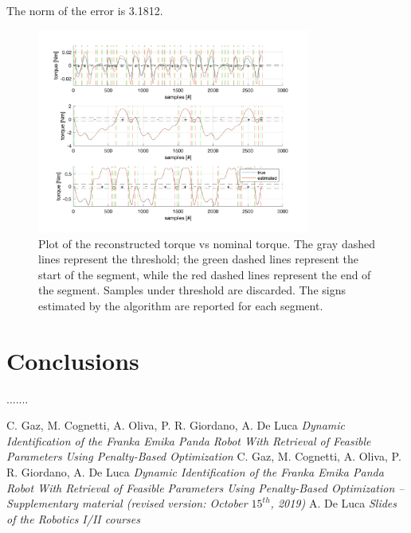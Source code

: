 \documentclass{article}
\begin{document}
The norm of the error is 3.1812.

\begin{figure}[!htbp]
\centering
\includegraphics[width=0.8\textwidth]{images/3-dof/results_experiment4.png}
\caption{Plot of the reconstructed torque vs nominal torque. The gray dashed lines represent the threshold; the green dashed lines represent the start of the segment, while the red dashed lines represent the end of the segment. Samples under threshold are discarded. The signs estimated by the algorithm are reported for each segment.}
\end{figure}
\FloatBarrier

\section{Conclusions}
.......
\clearpage

\begin{thebibliography}{}
C. Gaz, M. Cognetti, A. Oliva, P. R. Giordano, A. De Luca
\emph {Dynamic Identification of the Franka Emika Panda Robot With Retrieval of Feasible Parameters Using Penalty-Based Optimization}
C. Gaz, M. Cognetti, A. Oliva, P. R. Giordano, A. De Luca
\emph {Dynamic Identification of the Franka Emika Panda Robot With Retrieval of Feasible Parameters Using Penalty-Based Optimization – Supplementary material (revised version: October $15^{th}$, 2019)}
A. De Luca
\emph {Slides of the Robotics I/II courses}
\end{thebibliography}
\end{document}
